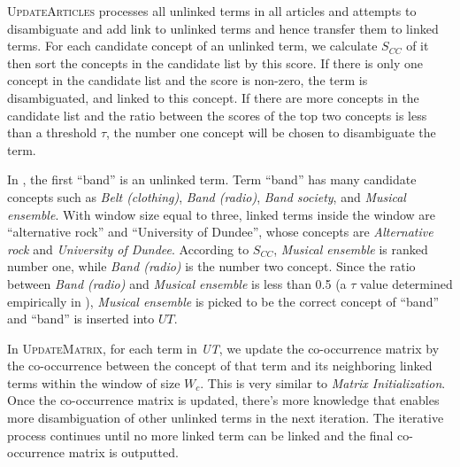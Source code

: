 \textsc{UpdateArticles} processes all unlinked terms in all articles and attempts
to disambiguate and add link to unlinked terms and hence transfer them
to linked terms.
For each candidate concept of an unlinked term, we calculate $S_{CC}$ of it then sort the
concepts in the candidate list by this score. If there is only one concept in the candidate list and
the score is non-zero, the term is disambiguated, and linked to this concept.
If there are more concepts in the candidate list and the ratio between
the scores of the top two concepts is less than a threshold $\tau$,
the number one concept will be chosen to disambiguate the term.

In , the first ``band'' is an unlinked term.
Term ``band'' has many candidate concepts such as
\emph{Belt (clothing)}, \emph{Band (radio)}, \emph{Band society}, and
\emph{Musical ensemble}.
With window size equal to three, linked terms inside the window are
``alternative rock'' and ``University of Dundee'',
whose concepts are \emph{Alternative rock} and \emph{University of Dundee}.
According to $S_{CC}$, \emph{Musical ensemble} is ranked number one,
while \emph{Band (radio)} is the number two concept.
Since the ratio between \emph{Band (radio)} and \emph{Musical ensemble} is less
than 0.5 (a $\tau$ value determined empirically in ),
\emph{Musical ensemble} is picked to be the correct concept of ``band'' and
``band'' is inserted into $UT$.

In \textsc{UpdateMatrix}, for each term in {\em UT},
we update the co-occurrence matrix by the co-occurrence between the concept of
that term and its neighboring linked terms within the window of size $W_c$. This is
very similar to {\em Matrix Initialization}.
Once the co-occurrence matrix is updated, there's more knowledge that enables
more disambiguation of other unlinked terms in the next iteration.
The iterative process continues until no more linked term can be linked
and the final co-occurrence matrix is outputted.

